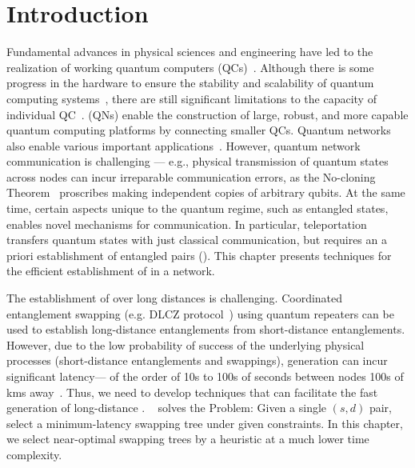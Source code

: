 \section{Introduction}
\label{sec:swapping_intro}

Fundamental advances in physical sciences and engineering have led to the realization of working quantum computers (QCs)~\cite{google-nature-19,ibm-quantum-roadmap}.
Although there is some progress in the hardware to ensure the stability and scalability of quantum computing systems~\cite{tianyi-laser,tianyi-photon},
there are still significant limitations 
to the capacity of individual QC~\cite{Caleffi18}.   (QNs) enable the construction of large, robust, and more capable quantum computing platforms by connecting smaller QCs. Quantum networks~\cite{qn}
also enable various important applications~\cite{Eldredge_2018,qkd,atomic,secure,byzantine}.
However, quantum network communication is challenging --- e.g., physical transmission of quantum states across nodes can incur irreparable communication errors, as 
the No-cloning Theorem~\cite{Dieks-nocloning} proscribes making 
independent copies of arbitrary qubits. 
At the same time, certain aspects unique to the quantum regime, such as entangled states, enables 
novel mechanisms for communication.
In particular, teleportation~\cite{Bennett+:93} transfers quantum states with just classical
communication, but requires an a priori establishment of entangled pairs (\epss).
This chapter presents techniques for the efficient establishment of \epss in a network.

The establishment of \epss over long distances is challenging. 
Coordinated entanglement swapping (e.g. DLCZ protocol~\cite{dlcz}) using quantum repeaters 
can be used to establish long-distance entanglements from short-distance entanglements.
However, due to the low probability of success of the underlying physical processes
(short-distance entanglements and swappings),  \eps generation can incur significant latency---
of the order of 10s to 100s of seconds between nodes 100s of kms away~\cite{gisin}.
Thus, we need to develop techniques that can facilitate the fast generation of long-distance \epss. 
~\cite{swapping-tqe-22} solves the \spp Problem: Given a single $(s,d)$ pair, select a minimum-latency swapping tree under given constraints. 
In this chapter, we select near-optimal swapping trees by a heuristic at a much lower time complexity.

